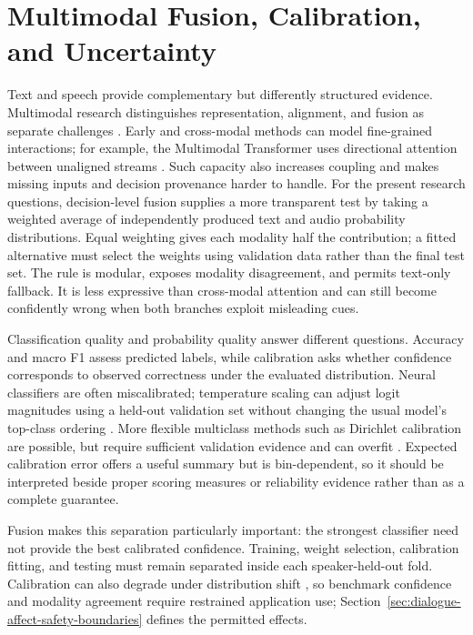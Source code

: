 \section{Multimodal Fusion, Calibration, and Uncertainty}
\label{sec:sota-fusion}
\label{sec:sota-calibration}

Text and speech provide complementary but differently structured evidence. Multimodal research distinguishes representation, alignment, and fusion as separate challenges \cite{baltrusaitis2019multimodal}. Early and cross-modal methods can model fine-grained interactions; for example, the Multimodal Transformer uses directional attention between unaligned streams \cite{tsai2019mult}. Such capacity also increases coupling and makes missing inputs and decision provenance harder to handle. For the present research questions, decision-level fusion supplies a more transparent test by taking a weighted average of independently produced text and audio probability distributions. Equal weighting gives each modality half the contribution; a fitted alternative must select the weights using validation data rather than the final test set. The rule is modular, exposes modality disagreement, and permits text-only fallback. It is less expressive than cross-modal attention and can still become confidently wrong when both branches exploit misleading cues.

Classification quality and probability quality answer different questions. Accuracy and macro F1 assess predicted labels, while calibration asks whether confidence corresponds to observed correctness under the evaluated distribution. Neural classifiers are often miscalibrated; temperature scaling can adjust logit magnitudes using a held-out validation set without changing the usual model's top-class ordering \cite{guo2017calibration}. More flexible multiclass methods such as Dirichlet calibration are possible, but require sufficient validation evidence and can overfit \cite{kull2019dirichlet}. Expected calibration error offers a useful summary but is bin-dependent, so it should be interpreted beside proper scoring measures or reliability evidence rather than as a complete guarantee.

Fusion makes this separation particularly important: the strongest classifier need not provide the best calibrated confidence. Training, weight selection, calibration fitting, and testing must remain separated inside each speaker-held-out fold. Calibration can also degrade under distribution shift \cite{ovadia2019shift}, so benchmark confidence and modality agreement require restrained application use; Section~\ref{sec:dialogue-affect-safety-boundaries} defines the permitted effects.

